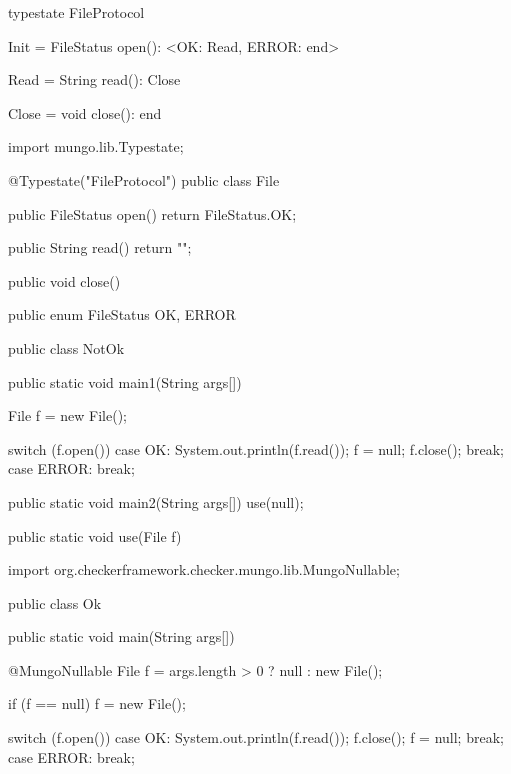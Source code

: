 \begin{code}
typestate FileProtocol {

  Init = {
    FileStatus open(): <OK: Read, ERROR: end>
  }

  Read = {
    String read(): Close
  }

  Close = {
    void close(): end
  }

}\end{code}

\begin{code}
import mungo.lib.Typestate;

@Typestate("FileProtocol")
public class File {

  public FileStatus open() {
    return FileStatus.OK;
  }

  public String read() {
    return "";
  }

  public void close() {

  }

}\end{code}

\begin{code}
public enum FileStatus {
  OK, ERROR
}\end{code}

\begin{code}
public class NotOk {
  public static void main1(String args[]) {
    File f = new File();

    switch (f.open()) {
      case OK:
        System.out.println(f.read());
        f = null;
        f.close();
        break;
      case ERROR:
        break;
    }
  }

  public static void main2(String args[]) {
    use(null);
  }

  public static void use(File f) {

  }
}\end{code}

\begin{code}
import org.checkerframework.checker.mungo.lib.MungoNullable;

public class Ok {
  public static void main(String args[]) {
    @MungoNullable File f = args.length > 0 ? null : new File();

    if (f == null) {
      f = new File();
    }

    switch (f.open()) {
      case OK:
        System.out.println(f.read());
        f.close();
        f = null;
        break;
      case ERROR:
        break;
    }
  }
}\end{code}

